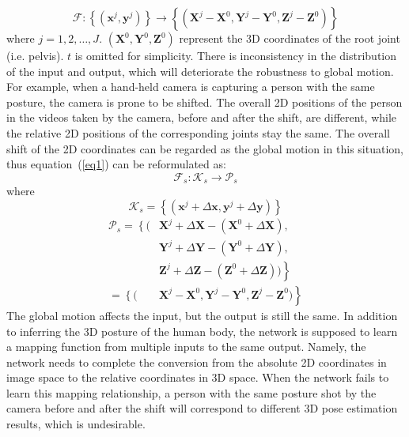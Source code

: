 \documentclass[sigconf]{acmart}
\begin{document}
\begin{equation}\label{eq1}
\mathcal{F}:\left\{(\mathbf{x}^{j},\mathbf{y}^{j})\right\}\rightarrow \left\{(\mathbf{X}^{j}-\mathbf{X}^{0},\mathbf{Y}^{j}-\mathbf{Y}^{0},\mathbf{Z}^{j}-\mathbf{Z}^{0})\right\}
\end{equation}
where $j=1,2,\ldots,J$. ${(\mathbf{X}^{0},\mathbf{Y}^{0},\mathbf{Z}^{0})}$ represent the 3D coordinates of the root joint (i.e. pelvis). ${t}$ is omitted for simplicity. There is inconsistency in the distribution of the input and output, which will deteriorate the robustness to global motion. For example, when a hand-held camera is capturing a person with the same posture, the camera is prone to be shifted. The overall 2D positions of the person in the videos taken by the camera, before and after the shift, are different, while the relative 2D positions of the corresponding joints stay the same. The overall shift of the 2D coordinates can be regarded as the global motion in this situation, thus equation~(\ref{eq1}) can be reformulated as:
\begin{equation}
\mathcal{F}_{s}:\mathcal{K}_{s}\rightarrow \mathcal{P}_{s}
\end{equation}
where
\begin{equation}\label{eq2}
\mathcal{K}_{s}=\left\{(\mathbf{x}^{j}+\Delta\mathbf{x},\mathbf{y}^{j}+\Delta\mathbf{y})\right\}
\end{equation}
\begin{equation}
\begin{aligned}
\mathcal{P}_{s}=\left\{\right.(&\mathbf{X}^{j}+\Delta\mathbf{X}-(\mathbf{X}^{0}+\Delta\mathbf{X}),\\
&\mathbf{Y}^{j}+\Delta\mathbf{Y}-(\mathbf{Y}^{0}+\Delta\mathbf{Y}),\\
&\mathbf{Z}^{j}+\Delta\mathbf{Z}-(\mathbf{Z}^{0}+\Delta\mathbf{Z}))\left.\right\}\\
=\left\{\right.(&\mathbf{X}^{j}-\mathbf{X}^{0},\mathbf{Y}^{j}-\mathbf{Y}^{0},\mathbf{Z}^{j}-\mathbf{Z}^{0})\left.\right\}
\end{aligned}
\end{equation}
The global motion affects the input, but the output is still the same. In addition to inferring the 3D posture of the human body, the network is supposed to learn a mapping function from multiple inputs to the same output. Namely, the network needs to complete the conversion from the absolute 2D coordinates in image space to the relative coordinates in 3D space. When the network 
fails to learn this mapping relationship, a person with the same posture shot by the camera before and after the shift will correspond to different 3D pose estimation results, which is undesirable.
\end{document}
